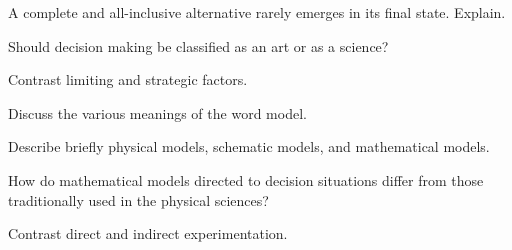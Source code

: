 \begin{exercises}
    \begin{exercise}
    \label{sea-07-01}
        A complete and all-inclusive alternative rarely emerges in its final state. Explain.
    \end{exercise}
    \begin{solution}
    \end{solution}
    
    \begin{exercise}
    \label{sea-07-02}
        Should decision making be classified as an art or as a science?
    \end{exercise}
    \begin{solution}
    \end{solution}
    
    \begin{exercise}
    \label{sea-07-03}
        Contrast limiting and strategic factors.
    \end{exercise}
    \begin{solution}
    \end{solution}
    
    \begin{exercise}
    \label{sea-07-04}
        Discuss the various meanings of the word model.
    \end{exercise}
    \begin{solution}
    \end{solution}
    
    \begin{exercise}
    \label{sea-07-05}
        Describe briefly physical models, schematic models, and mathematical models.
    \end{exercise}
    \begin{solution}
    \end{solution}
    
    \begin{exercise}
    \label{sea-07-06}
        How do mathematical models directed to decision situations differ from those traditionally used in the physical sciences?
    \end{exercise}
    \begin{solution}
    \end{solution}
    
    \begin{exercise}
    \label{sea-07-07}
        Contrast direct and indirect experimentation.
    \end{exercise}
    \begin{solution}
    \end{solution}
    

\end{exercises}
